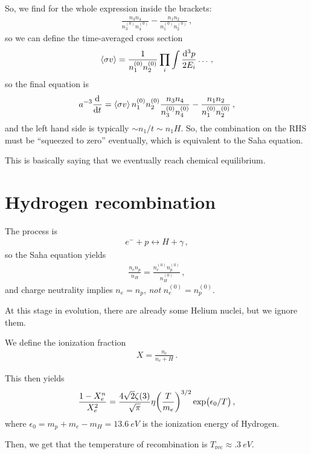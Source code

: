 \documentclass[main.tex]{subfiles}
\begin{document}
So, we find for the whole expression inside the brackets:
%
\begin{align}
\frac{n_3 n_4 }{n_3^{(0)} n_4^{(0)}}
- 
\frac{n_1 n_2 }{n_1^{(0)} n_2^{(0)}}
\,,
\end{align}
%
so we can define the time-averaged cross section 
%
\begin{align}
\expval{\sigma v} = \frac{1}{n_1^{(0)} n_2^{(0)}}
\prod_{i} \int \frac{ \dd[3]{p}}{2 E_i} \dots
\,,
\end{align}
%
so the final equation is 
%
\begin{align}
a^{-3} \dv[]{}{t} (n_1 a^3)
= \expval{\sigma v} n_1^{(0)} n_2^{(0)} 
\frac{n_3 n_4 }{n_3^{(0)} n_4^{(0)}}
- 
\frac{n_1 n_2 }{n_1^{(0)} n_2^{(0)}}
\,,
\end{align}
%
and the left hand side is typically \(\sim n_1 / t \sim n_1 H\). So, the combination on the RHS must be ``squeezed to zero'' eventually, which is equivalent to the Saha equation. 

This is basically saying that we eventually reach chemical equilibrium. 

\section{Hydrogen recombination}

The process is 
%
\begin{align}
e^{-} + p \leftrightarrow H + \gamma 
\,,
\end{align}
%
so the Saha equation yields 
%
\begin{align}
\frac{n_e n_p}{n_H} = \frac{n_e^{(0)} n_p^{(0)}}{n_H^{(0)}}
\,,
\end{align}
%
and charge neutrality implies \(n_e = n_p\), \emph{not} \(n_e^{(0)} = n_p^{(0)}\). 

At this stage in evolution, there are already some Helium nuclei, but we ignore them. 

We define the ionization fraction 
%
\begin{align}
X = \frac{n_e}{n_e + H}
\,.
\end{align}

This then yields 
%
\begin{align}
\frac{1 - X_e^{n}}{X_e^{2}} = \frac{4 \sqrt{2} \zeta (3)}{\sqrt{\pi }} \eta \qty(\frac{T}{m_e})^{3/2} \exp(\epsilon_{0} / T)
\,,
\end{align}
%
where \(\epsilon_0 = m_p + m_e - m_H = \SI{13.6}{eV}\) is the ionization energy of Hydrogen. 

Then, we get that the temperature of recombination is \(T _{\text{rec}} \approx \SI{.3}{eV}\). 
\end{document}
